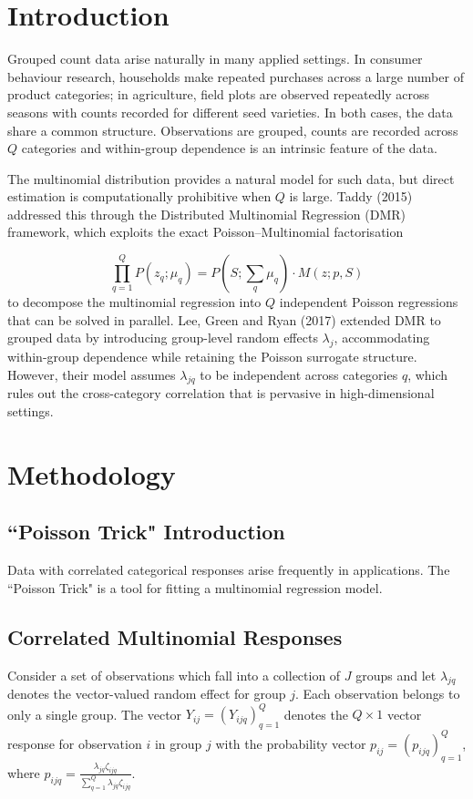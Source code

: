 \documentclass[]{article}
\theoremstyle{definition}
\begin{document}
	
	\thispagestyle{empty}
	
	\section{Introduction}
	
	Grouped count data arise naturally in many applied settings. In consumer behaviour research, households make repeated purchases across a large number of product categories; in agriculture, field plots are observed repeatedly across seasons with counts recorded for different seed varieties. In both cases, the data share a common structure. Observations are grouped, counts are recorded across $Q$ categories and within-group dependence is an intrinsic feature of the data.
	
	The multinomial distribution provides a natural model for such data, but direct estimation is computationally prohibitive when $Q$ is large. Taddy (2015) addressed this through the Distributed Multinomial Regression (DMR) framework, which exploits the exact Poisson–Multinomial factorisation
	
	\begin{equation}
		\prod_{q=1}^{Q}P(z_{q};\mu_{q})=P(S;\sum_{q}\mu_{q})\cdot M(z;p,S)
	\end{equation}
	to decompose the multinomial regression into $Q$ independent Poisson regressions that can be solved in parallel. Lee, Green and Ryan (2017) extended DMR to grouped data by introducing group-level random effects $\lambda_{j}$, accommodating within-group dependence while retaining the Poisson surrogate structure. However, their model assumes $\lambda_{jq}$ to be independent across categories $q$, which rules out the cross-category correlation that is pervasive in high-dimensional settings. 

	\section{Methodology}

    \subsection{``Poisson Trick" Introduction}
    Data with correlated categorical responses arise frequently in applications. The ``Poisson Trick" is a tool for fitting a multinomial regression model.
    
	\subsection{Correlated Multinomial Responses}
	Consider a set of observations which fall into a collection of $J$ groups and let $\lambda_{jq}$ denotes the vector-valued random effect for group $j$. Each observation belongs to only a single group. The vector $Y_{ij}=(Y_{ijq})_{q=1}^{Q}$ denotes the $Q\times 1$ vector response for observation $i$ in group $j$ with the probability vector $p_{ij}=(p_{ijq})_{q=1}^{Q}$, where $p_{ijq}=\frac{\lambda_{jq}\zeta_{ijq}}{\sum_{q=1}^{Q}\lambda_{jq}\zeta_{ijq}}$. 
	
\end{document}
